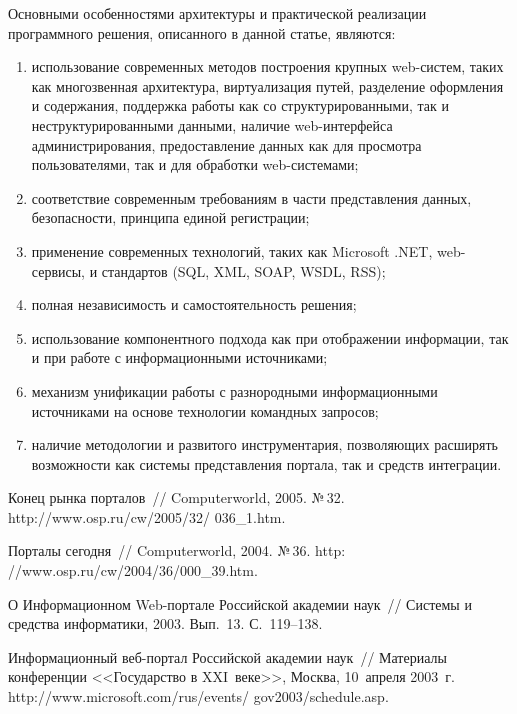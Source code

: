 \begin{multicols}{2}
 Основными особенностями архитектуры и практической реализации программного
решения, описанного в данной статье, являются:
 \begin{enumerate}[(1)]
\item использование современных методов построения крупных web-систем, таких как
многозвенная архитектура, виртуализация путей, разделение оформления и
содержания, поддержка работы как со структурированными, так и
неструктурированными данными, наличие web-интерфейса администрирования,
предоставление данных как для просмотра пользователями, так и для обработки
web-системами;
\item соответствие современным требованиям в час\-ти представления данных,
безопасности, принципа единой регистрации;
\item применение современных технологий, таких как Microsoft .NET, web-сервисы, и
стандартов (SQL, XML, SOAP, WSDL, RSS);
\item полная независимость и самостоятельность решения;
\item использование компонентного подхода как при отображении информации, так и при
работе с информационными источниками;
\item механизм унификации работы с разнородными информационными
источниками на основе технологии командных запросов;
\item наличие методологии и развитого инструментария, позволяющих расширять
возможности как системы представления портала, так и средств интеграции.
\end{enumerate}

{\small\frenchspacing
{%
\begin{thebibliography}{99}
 Конец рынка порталов~// Computerworld, %
2005. №\,32. {\sf http://www.osp.ru/cw/2005/32/ 036\_1.htm}.

Порталы сегодня~// Computerworld, %
2004. №\,36. {\sf http: //www.osp.ru/cw/2004/36/000\_39.htm}.

О Информационном Web-портале Российской академии наук~// Системы и средства
информатики, %
2003. Вып.~13. С.~119--138.

Информационный веб-портал Российской академии наук~// Материалы конференции
<<Государство в XXI~веке>>, Москва, 10~ап\-реля 2003~г. {\sf
http://www.microsoft.com/rus/events/ gov2003/schedule.asp}.


\end{thebibliography}}}
\end{multicols}
